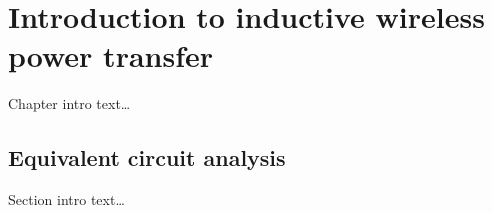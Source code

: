 \documentclass[11pt,a4paper,twoside,openany]{report}
\begin{document}
    \chapter{Introduction to inductive wireless power transfer}
    \label{chap:introduction-to-iwpt}

    Chapter intro text\dots

    \section{Equivalent circuit analysis}

        Section intro text\dots

\end{document}
